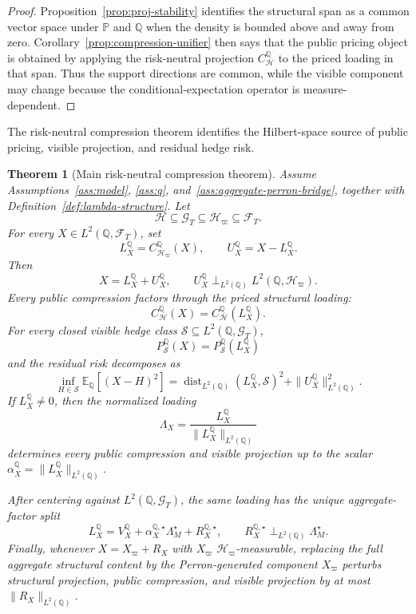 \documentclass[11pt,a4paper]{amsart}
\theoremstyle{plain}
\newtheorem{theorem}{Theorem}[section]
\theoremstyle{definition}
\theoremstyle{remark}
\DeclareMathOperator{\dist}{dist}
\newcommand{\PP}{\mathbb{P}}
\newcommand{\QQ}{\mathbb{Q}}
\newcommand{\EE}{\mathbb{E}}
\newcommand{\cF}{\mathcal{F}}
\newcommand{\cG}{\mathcal{G}}
\newcommand{\cH}{\mathcal{H}}
\newcommand{\cS}{\mathcal{S}}
\begin{document}
\begin{proof}
Proposition~\ref{prop:proj-stability} identifies the structural span as a common vector space under
\(\PP\) and \(\QQ\) when the density is bounded above and away from zero.  Corollary~\ref{prop:compression-unifier}
then says that the public pricing object is obtained by applying the risk-neutral projection
\(C_{\cH}^{\QQ}\) to the priced loading in that span.  Thus the support directions are common, while
the visible component may change because the conditional-expectation operator is measure-dependent.
\end{proof}

The risk-neutral compression theorem identifies the Hilbert-space source of public pricing,
visible projection, and residual hedge risk.

\begin{theorem}[Main risk-neutral compression theorem]\label{thm:main-risk-neutral-compression}
Assume Assumptions~\ref{ass:model}, \ref{ass:q}, and~\ref{ass:aggregate-perron-bridge}, together
with Definition~\ref{def:lambda-structure}.  Let
\[
        \cH\subseteq\cG_T\subseteq\cH_\varpi\subseteq\cF_T.
\]
For every \(X\in L^2(\QQ,\cF_T)\), set
\[
        L_X^\QQ=C_{\cH_\varpi}^\QQ(X),
        \qquad
        U_X^\QQ=X-L_X^\QQ.
\]
Then
\[
        X=L_X^\QQ+U_X^\QQ,
        \qquad
        U_X^\QQ\perp_{L^2(\QQ)}L^2(\QQ,\cH_\varpi).
\]
Every public compression factors through the priced structural loading:
\[
        C_{\cH}^\QQ(X)=C_{\cH}^\QQ(L_X^\QQ).
\]
For every closed visible hedge class \(\cS\subseteq L^2(\QQ,\cG_T)\),
\[
        P_{\cS}^\QQ(X)=P_{\cS}^\QQ(L_X^\QQ)
\]
and the residual risk decomposes as
\[
        \inf_{H\in\cS}\EE_\QQ[(X-H)^2]
        =
        \dist_{L^2(\QQ)}(L_X^\QQ,\cS)^2
        +
        \|U_X^\QQ\|_{L^2(\QQ)}^2.
\]
If \(L_X^\QQ\neq0\), then the normalized loading
\[
        \Lambda_X=\frac{L_X^\QQ}{\|L_X^\QQ\|_{L^2(\QQ)}}
\]
determines every public compression and visible projection up to the scalar
\(\alpha_X^\QQ=\|L_X^\QQ\|_{L^2(\QQ)}\).

After centering against \(L^2(\QQ,\cG_T)\), the same loading has the unique aggregate-factor split
\[
        L_X^\QQ
        =
        V_X^\QQ
        +
        \alpha_X^{\QQ,\star}\Lambda_M^\star
        +
        R_X^{\QQ,\star},
        \qquad
        R_X^{\QQ,\star}\perp_{L^2(\QQ)}\Lambda_M^\star.
\]
Finally, whenever \(X=X_\varpi+R_X\) with \(X_\varpi\) \(\cH_\varpi\)-measurable, replacing the
full aggregate structural content by the Perron-generated component \(X_\varpi\) perturbs
structural projection, public compression, and visible projection by at most
\(\|R_X\|_{L^2(\QQ)}\).
\end{theorem}
\end{document}
